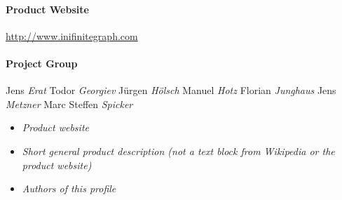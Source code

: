 
\paragraph{Product Website} \url{http://www.inifinitegraph.com}

\paragraph{Project Group}
Jens \textit{Erat}
Todor \textit{Georgiev}
J\"{u}rgen \textit{H\"{o}lsch}
Manuel \textit{Hotz}
Florian \textit{Junghaus}
Jens \textit{Metzner}
Marc Steffen \textit{Spicker}

\begin{itemize}
\item \emph{Product website}
\item \emph{Short general product description (not a text block from Wikipedia or the product website)}
\item \emph{Authors of this profile}
\end{itemize}